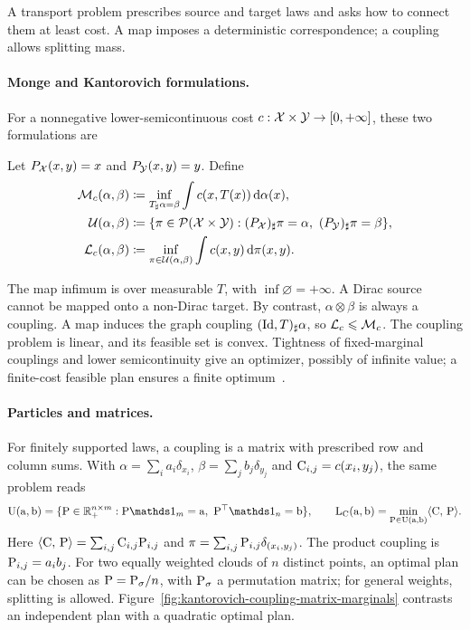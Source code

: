 A transport problem prescribes source and target laws and asks how to connect them at least cost. A map imposes a deterministic correspondence; a coupling allows splitting mass.

\paragraph{Monge and Kantorovich formulations.}
For a nonnegative lower-semicontinuous cost $c:\X\times\Y\to[0,+\infty]$, these two formulations are
\begin{defn}\label{def-continuous-couplings}
Let $P_\X(x,y)=x$ and $P_\Y(x,y)=y$. Define
\begin{align}
  \Monge_c(\alpha,\beta)
  &\eqdef\inf_{T_\sharp\alpha=\beta}\int c(x,T(x))\,\d\alpha(x),
  \label{eq-monge-continuous}\\
  \Couplings(\alpha,\beta)
  &\eqdef\{\pi\in\Pp(\X\times\Y):(P_\X)_\sharp\pi=\alpha,\ (P_\Y)_\sharp\pi=\beta\},
  \label{eq-coupling-generic}\\
  \MK_c(\alpha,\beta)
  &\eqdef\inf_{\pi\in\Couplings(\alpha,\beta)}\int c(x,y)\,\d\pi(x,y).
  \label{eq-mk-generic}
\end{align}
\end{defn}
The map infimum is over measurable $T$, with $\inf\varnothing=+\infty$. A Dirac source cannot be mapped onto a non-Dirac target. By contrast, $\alpha\otimes\beta$ is always a coupling. A map induces the graph coupling $(\Id,T)_\sharp\alpha$, so $\MK_c\leq\Monge_c$. The coupling problem is linear, and its feasible set is convex. Tightness of fixed-marginal couplings and lower semicontinuity give an optimizer, possibly of infinite value; a finite-cost feasible plan ensures a finite optimum~\citep{Villani09,SantambrogioBook}.

\paragraph{Particles and matrices.}
For finitely supported laws, a coupling is a matrix with prescribed row and column sums. With $\alpha=\sum_i a_i\delta_{x_i}$, $\beta=\sum_j b_j\delta_{y_j}$ and $\C_{i,j}=c(x_i,y_j)$, the same problem reads
\begin{equation}\label{eq-discr-couplings}
  \CouplingsD(\a,\b)=\{\P\in\RR_+^{n\times m}:\P\ones_m=\a,\ \P^\top\ones_n=\b\},
  \qquad
  \MKD_\C(\a,\b)=\min_{\P\in\CouplingsD(\a,\b)}\dotp{\C}{\P}.
\end{equation}
Here $\dotp{\C}{\P}=\sum_{i,j}\C_{i,j}\P_{i,j}$ and $\pi=\sum_{i,j}\P_{i,j}\delta_{(x_i,y_j)}$. The product coupling is $\P_{i,j}=a_i b_j$. For two equally weighted clouds of $n$ distinct points, an optimal plan can be chosen as $\P=\P_\sigma/n$, with $\P_\sigma$ a permutation matrix; for general weights, splitting is allowed. Figure~\ref{fig:kantorovich-coupling-matrix-marginals} contrasts an independent plan with a quadratic optimal plan.

